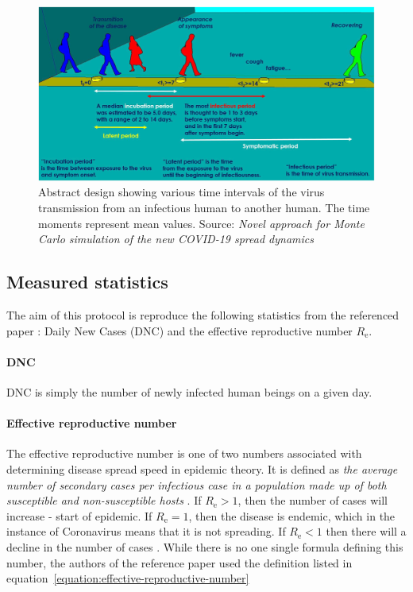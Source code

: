 \documentclass[a4paper]{article}
\begin{document}
\begin{figure}[h!]
	\centering
	\includegraphics{images/covid19_spread_dynamics.jpg}
	\caption{Abstract design showing various time intervals of the virus transmission from an infectious human to another human. The time moments represent mean values. Source: \textit{Novel approach for Monte Carlo simulation of the new COVID-19 spread dynamics} \cite{Maltezos2021}}
	\label{figure:covid-spread-dynamics}
\end{figure}



\subsection{Measured statistics}
The aim of this protocol is reproduce the following statistics from the referenced paper \cite{Maltezos2021}: Daily New Cases (DNC) and the effective reproductive number $R_\textrm{e}$.

\paragraph{DNC}
DNC is simply the number of newly infected human beings on a given day.

\paragraph{Effective reproductive number}
The effective reproductive number is one of two numbers associated with determining disease spread speed in epidemic theory. It is defined as \textit{the average number of secondary cases per infectious case in a population made up of both susceptible and non-susceptible hosts} \cite{Barratt2018}. If $R_\textrm{e} > 1$, then the number of cases will increase - start of epidemic. If $R_\textrm{e} = 1$, then the disease is endemic, which in the instance of Coronavirus means that it is not spreading. If $R_\textrm{e} < 1$ then there will a decline in the number of cases \cite{Barratt2018}. While there is no one single formula defining this number, the authors of the reference paper \cite{Maltezos2021} used the definition listed in equation~\eqref{equation:effective-reproductive-number}
\end{document}

